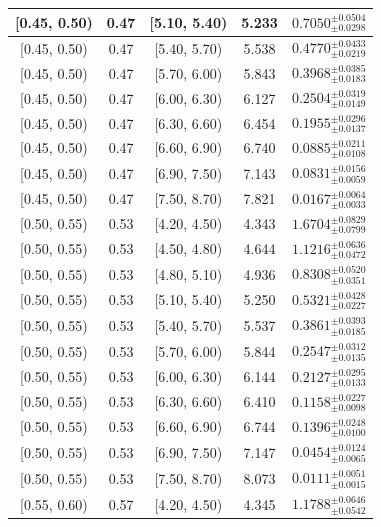 \begin{longtable}{|c|c|c|c|c|}
\hline
[0.45, 0.50) & 0.47 & [5.10, 5.40) & 5.233 & $0.7050^{ \pm 0.0504 }_{ \pm 0.0298 }$ \\ 
\hline
[0.45, 0.50) & 0.47 & [5.40, 5.70) & 5.538 & $0.4770^{ \pm 0.0433 }_{ \pm 0.0219 }$ \\ 
\hline
[0.45, 0.50) & 0.47 & [5.70, 6.00) & 5.843 & $0.3968^{ \pm 0.0385 }_{ \pm 0.0183 }$ \\ 
\hline
[0.45, 0.50) & 0.47 & [6.00, 6.30) & 6.127 & $0.2504^{ \pm 0.0319 }_{ \pm 0.0149 }$ \\ 
\hline
[0.45, 0.50) & 0.47 & [6.30, 6.60) & 6.454 & $0.1955^{ \pm 0.0296 }_{ \pm 0.0137 }$ \\ 
\hline
[0.45, 0.50) & 0.47 & [6.60, 6.90) & 6.740 & $0.0885^{ \pm 0.0211 }_{ \pm 0.0108 }$ \\ 
\hline
[0.45, 0.50) & 0.47 & [6.90, 7.50) & 7.143 & $0.0831^{ \pm 0.0156 }_{ \pm 0.0059 }$ \\ 
\hline
[0.45, 0.50) & 0.47 & [7.50, 8.70) & 7.821 & $0.0167^{ \pm 0.0064 }_{ \pm 0.0033 }$ \\ 
\hline
[0.50, 0.55) & 0.53 & [4.20, 4.50) & 4.343 & $1.6704^{ \pm 0.0829 }_{ \pm 0.0799 }$ \\ 
\hline
[0.50, 0.55) & 0.53 & [4.50, 4.80) & 4.644 & $1.1216^{ \pm 0.0636 }_{ \pm 0.0472 }$ \\ 
\hline
[0.50, 0.55) & 0.53 & [4.80, 5.10) & 4.936 & $0.8308^{ \pm 0.0520 }_{ \pm 0.0351 }$ \\ 
\hline
[0.50, 0.55) & 0.53 & [5.10, 5.40) & 5.250 & $0.5321^{ \pm 0.0428 }_{ \pm 0.0227 }$ \\ 
\hline
[0.50, 0.55) & 0.53 & [5.40, 5.70) & 5.537 & $0.3861^{ \pm 0.0393 }_{ \pm 0.0185 }$ \\ 
\hline
[0.50, 0.55) & 0.53 & [5.70, 6.00) & 5.844 & $0.2547^{ \pm 0.0312 }_{ \pm 0.0135 }$ \\ 
\hline
[0.50, 0.55) & 0.53 & [6.00, 6.30) & 6.144 & $0.2127^{ \pm 0.0295 }_{ \pm 0.0133 }$ \\ 
\hline
[0.50, 0.55) & 0.53 & [6.30, 6.60) & 6.410 & $0.1158^{ \pm 0.0227 }_{ \pm 0.0098 }$ \\ 
\hline
[0.50, 0.55) & 0.53 & [6.60, 6.90) & 6.744 & $0.1396^{ \pm 0.0248 }_{ \pm 0.0100 }$ \\ 
\hline
[0.50, 0.55) & 0.53 & [6.90, 7.50) & 7.147 & $0.0454^{ \pm 0.0124 }_{ \pm 0.0065 }$ \\ 
\hline
[0.50, 0.55) & 0.53 & [7.50, 8.70) & 8.073 & $0.0111^{ \pm 0.0051 }_{ \pm 0.0015 }$ \\ 
\hline
[0.55, 0.60) & 0.57 & [4.20, 4.50) & 4.345 & $1.1788^{ \pm 0.0646 }_{ \pm 0.0542 }$ \\ 

\end{longtable}
